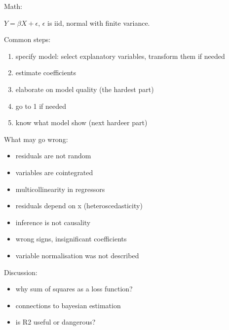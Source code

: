 \documentclass[letterpaper,10pt,english]{sphinxmanual}
\begin{document}
Math:

\(Y = \beta X + \epsilon\), \(\epsilon\) is iid, normal with finite variance.

Common steps:
\begin{enumerate}
%
\item {} 
specify model: select explanatory variables, transform them if needed

\item {} 
estimate coefficients

\item {} 
elaborate on model quality (the hardest part)

\item {} 
go to 1 if needed

\item {} 
know what model  show (next hardeer part)

\end{enumerate}

What may go wrong:
\begin{itemize}
\item {} 
residuals are not random

\item {} 
variables are cointegrated

\item {} 
multicollinearity in regressors

\item {} 
residuals depend on x (heteroscedasticity)

\item {} 
inference is not causality

\item {} 
wrong signs, insignificant coefficients

\item {} 
variable normalisation was not described

\end{itemize}

Discussion:
\begin{itemize}
\item {} 
why sum of squares as a loss function?

\item {} 
connections to bayesian estimation

\item {} 
is R2 useful or dangerous?

\end{itemize}
\end{document}
